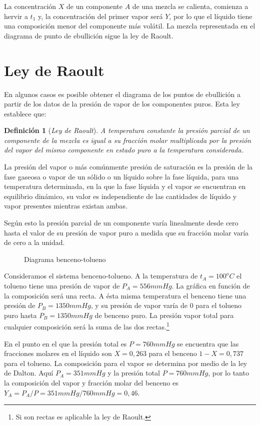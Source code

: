 \documentclass[11pt,openany]{book}
\newtheorem{defi}{Definición}
\begin{document}
La concentración $X$ de un componente $A$ de una mezcla se calienta, comienza a hervir a $t_1$ y, la 
concentración del primer vapor será $Y$, por lo que el líquido tiene una composición menor del componente más volátil.
La mezcla representada en el diagrama de punto de ebullición sigue la ley de Raoult.

\section{Ley de Raoult}

En algunos casos es posible obtener el diagrama de los puntos de ebullición a partir de los datos de
 la presión de vapor de los componentes puros. Esta ley establece que: 
\begin{defi}[\textit{Ley de Raoult}]
 A temperatura constante la presión parcial de un 
 componente de la mezcla es igual 
 a su fracción molar multiplicada 
 por la presión del vapor del mismo componente 
 en estado puro a la temperatura considerada.
\end{defi}
 La presión del vapor o más comúnmente presión de saturación es la presión de la fase gaseosa o 
 vapor de un sólido o un líquido sobre la fase líquida, para una temperatura determinada, en la que 
 la fase líquida y el vapor se encuentran en equilibrio dinámico, su valor es independiente de las 
 cantidades de líquido y vapor presentes mientras existan ambas.

 Según esto la presión parcial de un componente varía linealmente desde cero hasta el valor de su 
 presión de vapor puro a medida que su fracción molar varía de cero a la unidad.

 \begin{figure}[h]
  \centering
  
  \caption{Diagrama benceno-tolueno}  
\end{figure}
  
 Consideramos el sistema benceno-tolueno. A la temperatura de $t_A=100^oC$ el tolueno tiene una presión 
 de vapor de $P_A=556 mmHg$. La gráfica en función de la composición será una recta. A ésta misma 
 temperatura el benceno tiene una presión de $P_B=1350 mmHg$, y su presión de vapor varía de 0 para el
  tolueno puro hasta $P_B=1350 mmHg$ de benceno puro. La presión vapor total para cualquier composición será 
  la suma de las dos rectas.\footnote {Si son rectas es aplicable la ley de Raoult.}

  En el punto en el que la presión total es $P=760 mmHg$ se encuentra que las fracciones molares en 
  el líquido son $X=0,263$ para el benceno $1-X=0,737$ para el tolueno. La composición para el vapor se 
  determina por medio de la ley de Dalton. Aquí $P_A=351 mmHg$ y la presión total $P=760 mmHg$, por lo tanto la 
  composición del vapor y fracción molar del benceno es $Y_A=P_A/P=351mmHg/760mmHg=0,46$.
  
\end{document}
